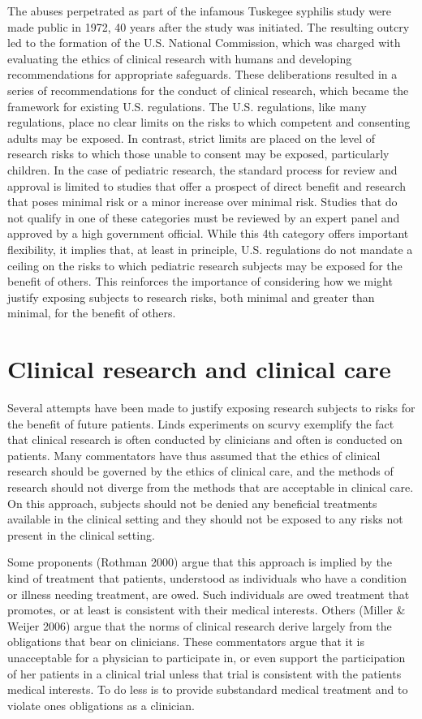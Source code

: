 \documentclass[12p]{article}
\begin{document}
The abuses perpetrated as part of the infamous Tuskegee syphilis study were made public in 1972, 40 years after the study was initiated. The resulting outcry led to the formation of the U.S. National Commission, which was charged with evaluating the ethics of clinical research with humans and developing recommendations for appropriate safeguards. These deliberations resulted in a series of recommendations for the conduct of clinical research, which became the framework for existing U.S. regulations. The U.S. regulations, like many regulations, place no clear limits on the risks to which competent and consenting adults may be exposed. In contrast, strict limits are placed on the level of research risks to which those unable to consent may be exposed, particularly children. In the case of pediatric research, the standard process for review and approval is limited to studies that offer a prospect of direct benefit and research that poses minimal risk or a minor increase over minimal risk. Studies that do not qualify in one of these categories must be reviewed by an expert panel and approved by a high government official. While this 4th category offers important flexibility, it implies that, at least in principle, U.S. regulations do not mandate a ceiling on the risks to which pediatric research subjects may be exposed for the benefit of others. This reinforces the importance of considering how we might justify exposing subjects to research risks, both minimal and greater than minimal, for the benefit of others. 

\section{Clinical research and clinical care}

 Several attempts have been made to justify exposing research subjects to risks for the benefit of future patients. Linds experiments on scurvy exemplify the fact that clinical research is often conducted by clinicians and often is conducted on patients. Many commentators have thus assumed that the ethics of clinical research should be governed by the ethics of clinical care, and the methods of research should not diverge from the methods that are acceptable in clinical care. On this approach, subjects should not be denied any beneficial treatments available in the clinical setting and they should not be exposed to any risks not present in the clinical setting.

Some proponents (Rothman 2000) argue that this approach is implied by the kind of treatment that patients, understood as individuals who have a condition or illness needing treatment, are owed. Such individuals are owed treatment that promotes, or at least is consistent with their medical interests. Others (Miller & Weijer 2006) argue that the norms of clinical research derive largely from the obligations that bear on clinicians. These commentators argue that it is unacceptable for a physician to participate in, or even support the participation of her patients in a clinical trial unless that trial is consistent with the patients medical interests. To do less is to provide substandard medical treatment and to violate ones obligations as a clinician.
\end{document}
